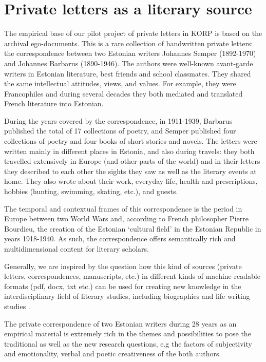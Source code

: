 \documentclass[runningheads]{llncs}
\begin{document}
\section{Private letters as a literary source}

The empirical base of our pilot project of private letters in KORP is based on the archival ego-documents. This is a rare collection of handwritten private letters: the correspondence between two Estonian writers Johannes Semper (1892-1970) and Johannes Barbarus (1890-1946). The authors were well-known avant-garde writers in Estonian literature, best friends and school classmates. They shared the same intellectual attitudes, views, and values. For example, they were Francophiles and during several decades they both mediated and translated French literature into Estonian. 

During the years covered by the correspondence, in 1911-1939, Barbarus published the total of 17 collections of poetry, and Semper published four collections of poetry and four books of short stories and novels. The letters were written mainly in different places in Estonia, and also during travels: they both travelled extensively in Europe (and other parts of the world) and in their letters they described to each other the sights they saw as well as the literary events at home. They also wrote about their work, everyday life, health and prescriptions, hobbies (hunting, swimming, skating, etc.), and guests. 

The temporal and contextual frames of this correspondence is the period in Europe between two World Wars and, according to French philosopher Pierre Bourdieu, the creation of  the Estonian ‘cultural field’ in the Estonian Republic in years 1918-1940. As such, the correspondence offers semantically rich and multidimensional content for literary scholars.  

Generally, we are inspired by the question how this kind of sources (private letters, correspondences, manuscripts, etc.) in different kinds of machine-readable formats (pdf, docx, txt etc.) can be used for creating new knowledge in the interdisciplinary field of literary studies, including biographics and life writing studies \cite{2015}. 

The private correspondence of two Estonian writers during 28 years as an empirical material is extremely rich in the themes and possibilities to pose the traditional as well as the new research questions, e.g the factors of subjectivity and emotionality, verbal and poetic creativeness of the both authors.  
\end{document}
